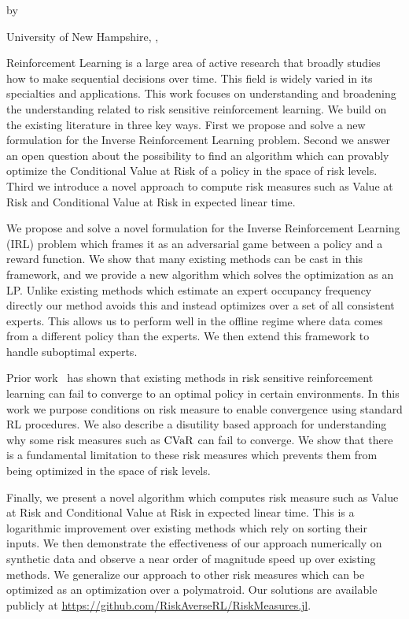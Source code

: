 
\begin{center}
  {\bfseries \thesistitle\par}
  by\par
  \thesisauthor\par
  University of New Hampshire, \thesismonth, \thesisyear\par
\end{center}

Reinforcement Learning is a large area of active research that broadly studies how to make sequential decisions over time. This field is widely varied in its specialties and applications. This work focuses on understanding and broadening the understanding related to risk sensitive reinforcement learning. We build on the existing literature in three key ways. First we propose and solve a new formulation for the Inverse Reinforcement Learning problem. Second we answer an open question about the possibility to find an algorithm which can provably optimize the Conditional Value at Risk of a policy in the space of risk levels. Third we introduce a novel approach to compute risk measures such as Value at Risk and Conditional Value at Risk in expected linear time.

We propose and solve a novel formulation for the Inverse Reinforcement Learning (IRL) problem which frames it as an adversarial game between a policy and a reward function. We show that many existing methods can be cast in this framework, and we provide a new algorithm which solves the optimization as an LP. Unlike existing methods which estimate an expert occupancy frequency directly our method avoids this and instead optimizes over a set of all consistent experts. This allows us to perform well in the offline regime where data comes from a different policy than the experts. We then extend this framework to handle suboptimal experts.

Prior work~\cite{Hau2023DP,Durand2025} has shown that existing methods in risk sensitive reinforcement learning can fail to converge to an optimal policy in certain environments. In this work we purpose conditions on risk measure to enable convergence using standard RL procedures. We also describe a disutility based approach for understanding why some risk measures such as $\operatorname{CVaR}$ can fail to converge. We show that there is a fundamental limitation to these risk measures which prevents them from being optimized in the space of risk levels. 

Finally, we present a novel algorithm which computes risk measure such as Value at Risk and Conditional Value at Risk in expected linear time. This is a logarithmic improvement over existing methods which rely on sorting their inputs. We then demonstrate the effectiveness of our approach numerically on synthetic data and observe a near order of magnitude speed up over existing methods. We generalize our approach to other risk measures which can be optimized as an optimization over a polymatroid. Our solutions are  available publicly at \url{https://github.com/RiskAverseRL/RiskMeasures.jl}.
